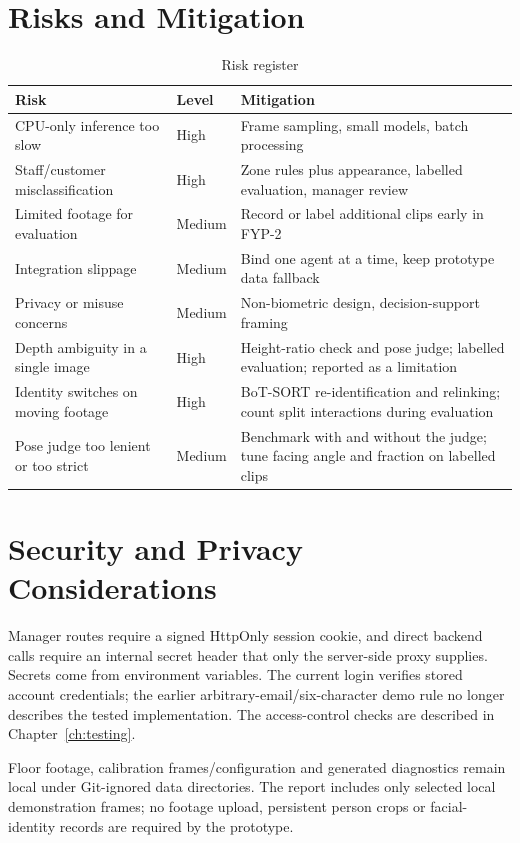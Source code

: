 \section{Risks and Mitigation}
\begin{table}[H]
\centering
\caption{Risk register}
\begin{tabular}{P{0.3\textwidth}P{0.1\textwidth}P{0.4\textwidth}}
\toprule
Risk & Level & Mitigation\\
\midrule
CPU-only inference too slow & High & Frame sampling, small models, batch processing\\
Staff/customer misclassification & High & Zone rules plus appearance, labelled evaluation, manager review\\
Limited footage for evaluation & Medium & Record or label additional clips early in FYP-2\\
Integration slippage & Medium & Bind one agent at a time, keep prototype data fallback\\
Privacy or misuse concerns & Medium & Non-biometric design, decision-support framing\\
Depth ambiguity in a single image & High & Height-ratio check and pose judge; labelled evaluation; reported as a limitation\\
Identity switches on moving footage & High & BoT-SORT re-identification and relinking; count split interactions during evaluation\\
Pose judge too lenient or too strict & Medium & Benchmark with and without the judge; tune facing angle and fraction on labelled clips\\
\bottomrule
\end{tabular}
\end{table}

\section{Security and Privacy Considerations}
Manager routes require a signed HttpOnly session cookie, and direct backend calls require an internal secret header that only the server-side proxy supplies. Secrets come from environment variables. The current login verifies stored account credentials; the earlier arbitrary-email/six-character demo rule no longer describes the tested implementation. The access-control checks are described in Chapter~\ref{ch:testing}.

Floor footage, calibration frames/configuration and generated diagnostics remain local under Git-ignored data directories. The report includes only selected local demonstration frames; no footage upload, persistent person crops or facial-identity records are required by the prototype.

